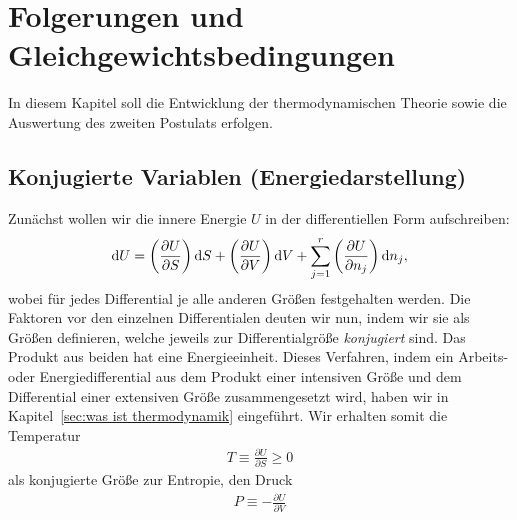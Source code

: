 
\chapter{Folgerungen und Gleichgewichtsbedingungen}

In diesem Kapitel soll die Entwicklung der thermodynamischen Theorie sowie die Auswertung des zweiten Postulats erfolgen.

\section{Konjugierte Variablen (Energiedarstellung)}

Zunächst wollen wir die innere Energie $U$ in der differentiellen Form aufschreiben:
\begin{align}
    \label{eq:innere energie differentielle form}
    \mathop{}\!\mathrm{d} U = \left(\frac{\partial U}{\partial S}\right) \mathop{}\!\mathrm{d} S + \left(\frac{\partial U}{\partial V}\right) \mathop{}\!\mathrm{d} V + \sum_{j = 1}^r \left(\frac{\partial U}{\partial n_j}\right) \mathop{}\!\mathrm{d} n_j,
\end{align}
wobei für jedes Differential je alle anderen Größen festgehalten werden. 
Die Faktoren vor den einzelnen Differentialen deuten wir nun, indem wir sie als Größen definieren, welche jeweils zur Differentialgröße \textit{konjugiert} sind.
Das Produkt aus beiden hat eine Energieeinheit.
Dieses Verfahren, indem ein Arbeits- oder Energiedifferential aus dem Produkt einer intensiven Größe und dem Differential einer extensiven Größe zusammengesetzt wird, haben wir in Kapitel~\ref{sec:was ist thermodynamik} eingeführt.
Wir erhalten somit die Temperatur
\begin{align}
    \label{eq:def_temperatur}
    T \equiv \frac{\partial U}{\partial S} \geq 0
\end{align}
als konjugierte Größe zur Entropie, den Druck
\begin{align}
    \label{eq:def_druck}
    P \equiv -\frac{\partial U}{\partial V}
\end{align}
